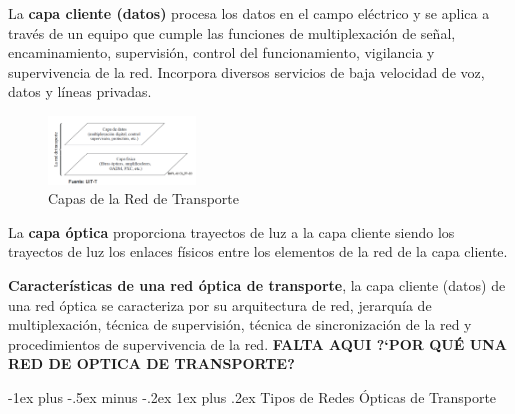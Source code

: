 \documentclass[10pt,portrait, twocolumn]{article}
\makeatletter
\renewcommand{\subsubsection}{\@startsection{subsubsection}{3}{0mm}%
                                {-1ex plus -.5ex minus -.2ex}%
                                {1ex plus .2ex}%
                                {\normalfont\small\bfseries}}
\makeatother
\begin{document}
La \textbf{capa cliente (datos)} procesa los datos en el campo eléctrico y se aplica a través de un equipo que cumple las funciones de multiplexación de señal, encaminamiento, supervisión, control del funcionamiento, vigilancia y supervivencia de la red. Incorpora diversos servicios de baja velocidad de voz, datos y líneas privadas.

\begin{figure}[h!]
	\centering
     \includegraphics[width=0.35\textwidth]{Capa}
      \caption{Capas de la Red de Transporte}
      \label{fig:Regiones de frecuencias}
  \end{figure}
  
 La \textbf{capa óptica} proporciona trayectos de luz a la capa cliente siendo los trayectos de luz los enlaces físicos entre los elementos de la red de la capa cliente.
 
\textbf{Características de una red óptica de transporte}, la capa cliente (datos) de una red óptica se caracteriza por su arquitectura de red, jerarquía de multiplexación, técnica de supervisión, técnica de sincronización de la red y procedimientos de supervivencia de la red. \textbf{FALTA AQUI ?`POR QUÉ UNA RED DE OPTICA DE TRANSPORTE?}

\subsubsection{Tipos de Redes Ópticas de Transporte}
\end{document}
